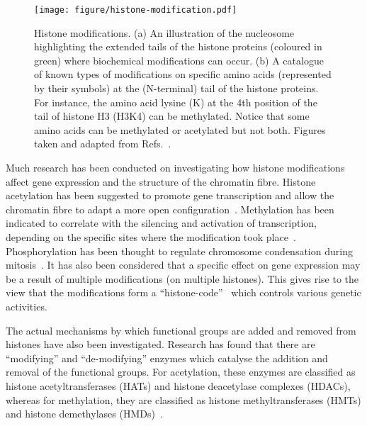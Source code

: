 \documentclass[12pt]{article}
\begin{document}
\begin{figure}[h]
\centering
\texttt{[image: figure/histone-modification.pdf]}
\caption{Histone modifications. (a) An illustration of the nucleosome highlighting the extended tails of the histone proteins (coloured in green) where biochemical modifications can occur. (b) A catalogue of known types of modifications on specific amino acids (represented by their symbols) at the (N-terminal) tail of the histone proteins. For instance, the amino acid lysine (K) at the 4th position of the tail of histone H3 (H3K4) can be methylated. Notice that some amino acids can be methylated or acetylated but not both. Figures taken and adapted from Refs.~\cite{molcellbiobook, rosa2005}.}
\label{fig:histone}
\end{figure}

Much research has been conducted on investigating how histone modifications affect gene expression and the structure of the chromatin fibre. Histone acetylation has been suggested to promote gene transcription and allow the chromatin fibre to adapt a more open configuration~\cite{shahbazian2007}. Methylation has been indicated to correlate with the silencing and activation of transcription, depending on the specific sites where the modification took place~\cite{greer2012}. Phosphorylation has been thought to regulate chromosome condensation during mitosis~\cite{sawicka2014}. It has also been considered that a specific effect on gene expression may be a result of multiple modifications (on multiple histones). This gives rise to the view that the modifications form a ``histone-code''~\cite{strahl2000} which controls various genetic activities.

The actual mechanisms by which functional groups are added and removed from histones have also been investigated. Research has found that there are ``modifying'' and ``de-modifying'' enzymes which catalyse the addition and removal of the functional groups. For acetylation, these enzymes are classified as histone acetyltransferases (HATs) and histone deacetylase complexes (HDACs), whereas for methylation, they are classified as histone methyltransferases (HMTs) and histone demethylases (HMDs)~\cite{shahbazian2007, greer2012}.
\end{document}
